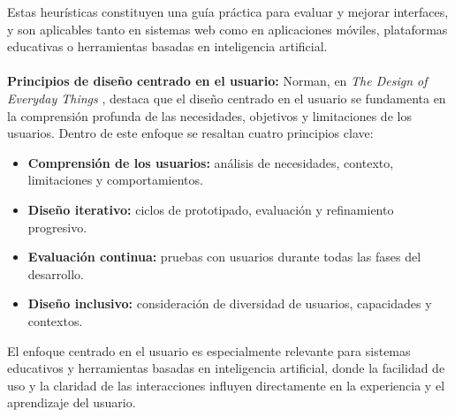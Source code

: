 Estas heurísticas constituyen una guía práctica para evaluar y mejorar interfaces, y son aplicables tanto en sistemas web como en aplicaciones móviles, plataformas educativas o herramientas basadas en inteligencia artificial.
\\
\\
\textbf{Principios de diseño centrado en el usuario:}  
Norman, en \textit{The Design of Everyday Things} \cite{Norman2013}, destaca que el diseño centrado en el usuario se fundamenta en la comprensión profunda de las necesidades, objetivos y limitaciones de los usuarios. Dentro de este enfoque se resaltan cuatro principios clave:

\begin{itemize}
    \item \textbf{Comprensión de los usuarios:} análisis de necesidades, contexto, limitaciones y comportamientos.
    \item \textbf{Diseño iterativo:} ciclos de prototipado, evaluación y refinamiento progresivo.
    \item \textbf{Evaluación continua:} pruebas con usuarios durante todas las fases del desarrollo.
    \item \textbf{Diseño inclusivo:} consideración de diversidad de usuarios, capacidades y contextos.
\end{itemize}

El enfoque centrado en el usuario es especialmente relevante para sistemas educativos y herramientas basadas en inteligencia artificial, donde la facilidad de uso y la claridad de las interacciones influyen directamente en la experiencia y el aprendizaje del usuario.
